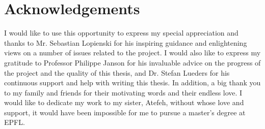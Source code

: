 \chapter*{Acknowledgements}
I would like to use this opportunity to express my special appreciation and thanks to Mr. Sebastian Lopienski for his inspiring guidance and enlightening views on a number of issues related to the project. I would also like to express my gratitude to Professor Philippe Janson for his invaluable advice on the progress of the project and the quality of this thesis, and Dr. Stefan Lueders for his continuous support and help with writing this thesis. In addition, a big thank you to my family and friends for their motivating words and their endless love. I would like to dedicate my work to my sister, Atefeh, without whose love and support, it would have been impossible for me to pursue a master's degree at EPFL. 
\clearpage